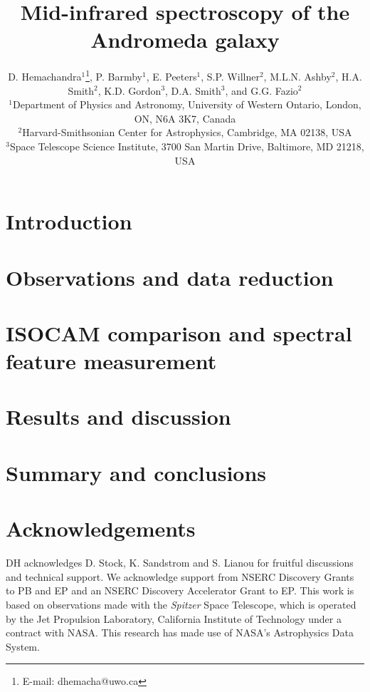 \documentclass[useAMS,usenatbib,a4paper]{mn2e}
\title[Mid-infrared spectroscopy of M31]{Mid-infrared spectroscopy of the Andromeda galaxy}
\author[D. Hemachandra et al.]
{D. Hemachandra$^{1}$\thanks{E-mail: dhemacha@uwo.ca},
P. Barmby$^{1}$, 
E. Peeters$^{1}$, 
S.P. Willner$^{2}$, 
M.L.N. Ashby$^{2}$,
H.A. Smith$^{2}$, 
\newauthor 
K.D. Gordon$^{3}$,
D.A. Smith$^{3}$,
and
G.G. Fazio$^{2}$\\
$^{1}$Department of Physics and Astronomy, University of Western Ontario, London, ON, N6A 3K7, Canada\\
$^{2}$Harvard-Smithsonian Center for Astrophysics, Cambridge, MA 02138, USA\\
$^{3}$Space Telescope Science Institute, 3700 San Martin Drive, Baltimore, MD 21218, USA
}
\begin{document}
\date{}

\maketitle

\label{firstpage}



\section{Introduction}



\section{Observations and data reduction}



\section{ISOCAM comparison and spectral feature measurement}
\label{sect:data_analysis}



\section{Results and discussion}



\section{Summary and conclusions}



\section*{Acknowledgements}


DH acknowledges D. Stock, K. Sandstrom and S. Lianou for fruitful discussions and technical support. 
We acknowledge support from NSERC Discovery Grants to PB and EP and an NSERC Discovery Accelerator Grant to EP. 
This work is based on observations made with the {\em Spitzer} Space Telescope, which is operated by the 
Jet Propulsion Laboratory, California Institute of Technology under a contract with NASA.
This research has made use of NASA's Astrophysics Data System.




{}

\bsp

\label{lastpage}
\end{document}
